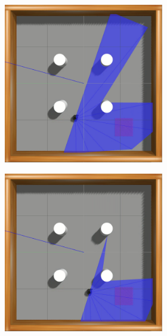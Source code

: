\begin{figure}[H]
\begin{center}
\begin{subfigure}[b]{0.60\textwidth}
        \begin{subfigure}[b]{0.24\textwidth}
            \includegraphics[width=\textwidth]{imagens/simulated_envs/sim_env2_ddpg/5.png}
        \end{subfigure}
        \hfill
        \begin{subfigure}[b]{0.24\textwidth}
            \includegraphics[width=\textwidth]{imagens/simulated_envs/sim_env2_ddpg/6.png}

\end{subfigure}
\end{subfigure}
\end{center}
\end{figure}
